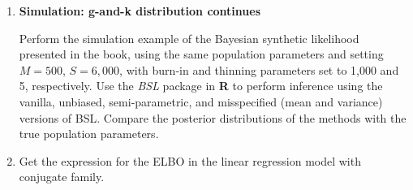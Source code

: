 \begin{enumerate}

	\item \textbf{Simulation: g-and-k distribution continues}
	
	Perform the simulation example of the Bayesian synthetic likelihood presented in the book, using the same population parameters and setting $M=500$, $S=6{,}000$, with burn-in and thinning parameters set to 1,000 and 5, respectively. Use the \textit{BSL} package in \textbf{R} to perform inference using the vanilla, unbiased, semi-parametric, and misspecified (mean and variance) versions of BSL. Compare the posterior distributions of the methods with the true population parameters. 
	
	
\item Get the expression for the ELBO in the linear regression model with conjugate family.
	
\end{enumerate}

